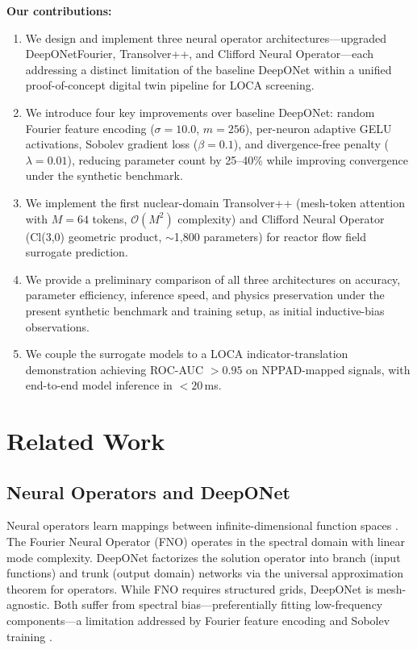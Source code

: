 \documentclass[conference]{IEEEtran}
\begin{document}
\textbf{Our contributions:}
\begin{enumerate}
    \item We design and implement three neural operator architectures---upgraded DeepONetFourier, Transolver++, and Clifford Neural Operator---each addressing a distinct limitation of the baseline DeepONet within a unified proof-of-concept digital twin pipeline for LOCA screening.
    \item We introduce four key improvements over baseline DeepONet: random Fourier feature encoding ($\sigma = 10.0$, $m = 256$), per-neuron adaptive GELU activations, Sobolev gradient loss ($\beta = 0.1$), and divergence-free penalty ($\lambda = 0.01$), reducing parameter count by 25--40\% while improving convergence under the synthetic benchmark.
    \item We implement the first nuclear-domain Transolver++ (mesh-token attention with $M = 64$ tokens, $\mathcal{O}(M^2)$ complexity) and Clifford Neural Operator (Cl(3,0) geometric product, $\sim$1,800 parameters) for reactor flow field surrogate prediction.
    \item We provide a preliminary comparison of all three architectures on accuracy, parameter efficiency, inference speed, and physics preservation under the present synthetic benchmark and training setup, as initial inductive-bias observations.
    \item We couple the surrogate models to a LOCA indicator-translation demonstration achieving ROC-AUC $> 0.95$ on NPPAD-mapped signals, with end-to-end model inference in $< 20$\,ms.
\end{enumerate}

\section{Related Work}
\label{sec:related}

\subsection{Neural Operators and DeepONet}
Neural operators learn mappings between infinite-dimensional function spaces \cite{lu2022comprehensive}. The Fourier Neural Operator (FNO) \cite{li2021fno} operates in the spectral domain with linear mode complexity. DeepONet \cite{lu2021deeponet, chen1995} factorizes the solution operator into branch (input functions) and trunk (output domain) networks via the universal approximation theorem for operators. While FNO requires structured grids, DeepONet is mesh-agnostic. Both suffer from spectral bias---preferentially fitting low-frequency components---a limitation addressed by Fourier feature encoding \cite{tancik2020ffn} and Sobolev training \cite{son2021sobolev}.
\end{document}
